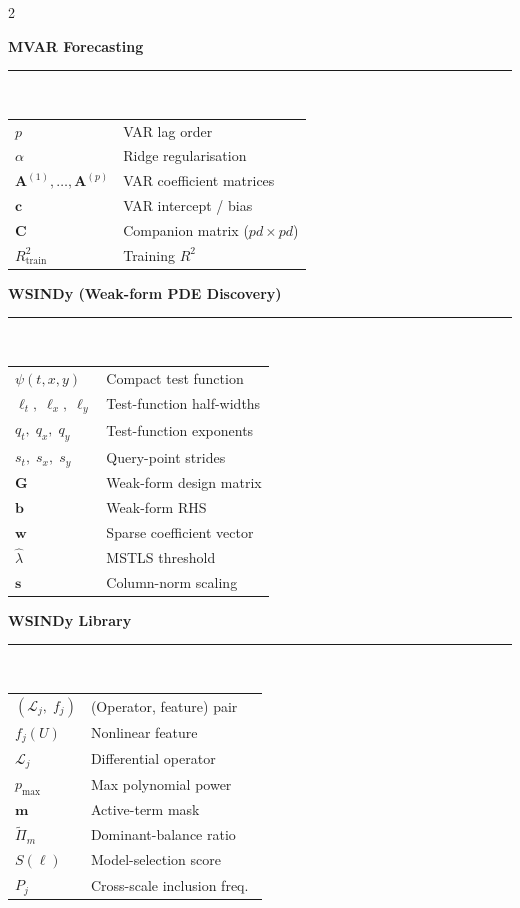 \begin{multicols}{2}
{\vspace{3pt}\noindent\textbf{MVAR Forecasting}\\[-2pt]
\rule{\columnwidth}{0.4pt}\\[2pt]
\begin{tabular}{@{}p{}p{}@{}}
$p$ & VAR lag order \\
$\alpha$ & Ridge regularisation \\
$\mathbf{A}^{(1)},\dots,\mathbf{A}^{(p)}$ & VAR coefficient matrices \\
$\mathbf{c}$ & VAR intercept / bias \\
$\mathbf{C}$ & Companion matrix ($pd\!\times\!pd$) \\
$R^2_{\mathrm{train}}$ & Training $R^2$ \\
\end{tabular}

\columnbreak

\noindent\textbf{WSINDy (Weak-form PDE Discovery)}\\[-2pt]
\rule{\columnwidth}{0.4pt}\\[2pt]
\begin{tabular}{@{}p{}p{}@{}}
$\psi(t,x,y)$ & Compact test function \\
$\ell_t,\;\ell_x,\;\ell_y$ & Test-function half-widths \\
$q_t,\;q_x,\;q_y$ & Test-function exponents \\
$s_t,\;s_x,\;s_y$ & Query-point strides \\
$\mathbf{G}$ & Weak-form design matrix \\
$\mathbf{b}$ & Weak-form RHS \\
$\mathbf{w}$ & Sparse coefficient vector \\
$\hat{\lambda}$ & MSTLS threshold \\
$\mathbf{s}$ & Column-norm scaling \\
\end{tabular}

\vspace{3pt}\noindent\textbf{WSINDy Library}\\[-2pt]
\rule{\columnwidth}{0.4pt}\\[2pt]
\begin{tabular}{@{}p{}p{}@{}}
$(\mathcal{L}_j,\;f_j)$ & (Operator, feature) pair \\
$f_j(U)$ & Nonlinear feature \\
$\mathcal{L}_j$ & Differential operator \\
$p_{\max}$ & Max polynomial power \\
$\mathbf{m}$ & Active-term mask \\
$\tilde{\Pi}_m$ & Dominant-balance ratio \\
$S(\boldsymbol{\ell})$ & Model-selection score \\
$P_j$ & Cross-scale inclusion freq.\ \\
\end{tabular}

}
\end{multicols}
